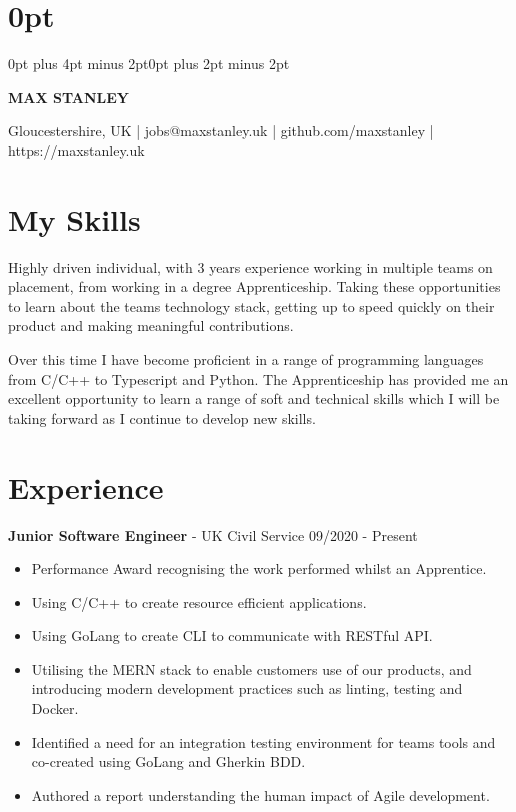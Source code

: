 \documentclass{article}
\begin{document}
\setlength\parindent{0pt}
\setlength{\parskip}{.8em} 
\titlespacing\section{0pt}{0pt plus 4pt minus 2pt}{0pt plus 2pt minus 2pt}

\begin{center}
\begin{huge}
\textbf{MAX STANLEY}
\end{huge}

Gloucestershire, UK
|
jobs@maxstanley.uk
|
github.com/maxstanley
|
https://maxstanley.uk

\end{center}

\section*{My Skills}

Highly driven individual, with 3 years experience working in multiple teams on placement, from working in a degree Apprenticeship.
Taking these opportunities to learn about the teams technology stack, getting up to speed quickly on their product and making meaningful contributions.

Over this time I have become proficient in a range of programming languages from C/C++ to Typescript and Python.
The Apprenticeship has provided me an excellent opportunity to learn a range of soft and technical skills which I will be taking forward as I continue to develop new skills.

\section*{Experience}

\textbf{Junior Software Engineer} - UK Civil Service \hfill 09/2020 - Present

\begin{multicols}{2}
\begin{itemize}
\itemsep0em
	\item Performance Award recognising the work performed whilst an Apprentice.
	\item Using C/C++ to create resource efficient applications.
	\item Using GoLang to create CLI to communicate with RESTful API.
	\item Utilising the MERN stack to enable customers use of our products, and introducing modern development practices such as linting, testing and Docker.
	\item Identified a need for an integration testing environment for teams tools and co-created using GoLang and Gherkin BDD.
	\item Authored a report understanding the human impact of Agile development.
\end{itemize}
\end{multicols}
\end{document}
